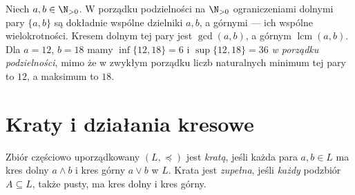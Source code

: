 \begin{przyklad}
Niech $a,b\in\N_{>0}$. W porządku podzielności na $\N_{>0}$
ograniczeniami
dolnymi pary $\{a,b\}$ są dokładnie wspólne dzielniki
$a,b$, a górnymi --- ich wspólne wielokrotności.
Kresem dolnym tej pary jest $\gcd(a,b)$, a górnym
$\operatorname{lcm}(a,b)$. Dla $a=12$, $b=18$
mamy $\inf\{12,18\}=6$ i $\sup\{12,18\}=36$
\emph{w porządku podzielności}, mimo że w zwykłym
porządku liczb naturalnych minimum tej pary to $12$,
a maksimum to $18$.
\end{przyklad}

\section{Kraty i działania kresowe}\label{sec:order-lattices}
\begin{definicja}[Krata]\label{def:lattice}
Zbiór częściowo uporządkowany $(L,\preceq)$ jest
\emph{kratą}, jeśli każda para $a,b\in L$ ma kres
dolny $a\wedge b$ i kres górny $a\vee b$ w $L$.
Krata jest \emph{zupełna}, jeśli \emph{każdy} podzbiór
$A\subseteq L$, także pusty, ma kres dolny i kres górny.
\end{definicja}

